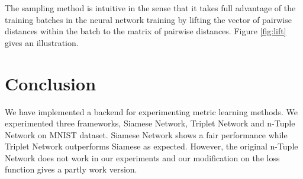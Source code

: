 \documentclass[10pt,twocolumn,letterpaper]{article}
\begin{document}
	The sampling method is intuitive in the sense that it takes full advantage of the training batches in the neural network training by lifting the vector of pairwise distances within the batch to the matrix of pairwise distances. Figure \ref{fig:lift} gives an illustration. 
	\section{Conclusion \label{sec:Conc}}
		We have implemented a backend for experimenting metric learning methods. We experimented three frameworks, Siamese Network, Triplet Network and n-Tuple Network on MNIST dataset. Siamese Network shows a fair performance while Triplet Network outperforms Siamese as expected. However, the original n-Tuple Network does not work in our experiments and our modification on the loss function gives a partly work version.
	{\small
		
		
	}
	
\end{document}
